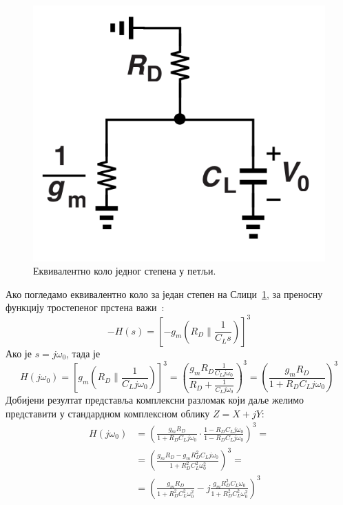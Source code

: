 \documentclass[master]{finthesis}
\begin{document}
\begin{figure}[!ht]
	 \centering
	 \includegraphics[scale=0.2]{slike/ring_osc_3.png}
	 \caption{Еквивалентно коло једног степена у петљи.}
	 \label{ring_osc_3}
\end{figure}
Ако погледамо еквивалентно коло за један степен на Слици~\ref{ring_osc_3}, за преносну функцију тростепеног прстена важи~\cite{Razavi:PLL_CMOS_2020}:
\begin{equation} 
	\label{osc_feedback_eq_9}
	-H(s) = \left[-g_{m}\left(R_{D}\|\frac{1}{C_{L}s}\right)\right]^{3}
\end{equation}
Ако је $s=j\omega_{0}$, тада је
\begin{equation} 
	\label{osc_feedback_eq_10}
	\displaystyle
	H(j\omega_{0}) = \left[g_{m}\left(R_{D}\|\frac{1}{C_{L}j\omega_{0}}\right)\right]^{3} = \left(\frac{g_{m}R_{D}\displaystyle\frac{1}{C_{L}j\omega_{0}}}{R_{D}+\displaystyle\frac{1}{C_{L}j\omega_{0}}}\right)^{3} = \left(\frac{g_{m}R_{D}}{1+R_{D}C_{L}j\omega_{0}}\right)^{3}
\end{equation}
Добијени резултат представља комплексни разломак који даље желимо представити у стандардном комплексном облику $Z = X + jY$:
\begin{equation} 
	\label{osc_feedback_eq_11}
	\displaystyle
	\begin{split}
		H(j\omega_{0}) &= \left(\frac{g_{m}R_{D}}{1+R_{D}C_{L}j\omega_{0}}\cdot\frac{1-R_{D}C_{L}j\omega_{0}}{1-R_{D}C_{L}j\omega_{0}}\right)^{3} = \\
			       &= \left(\frac{g_{m}R_{D}-g_{m}R_{D}^{2}C_{L}j\omega_{0}}{1+R_{D}^{2}C_{L}^{2}\omega_{0}^{2}}\right)^{3} = \\
			       &= \left(\frac{g_{m}R_{D}}{1+R_{D}^{2}C_{L}^{2}\omega_{0}^2}-j\frac{g_{m}R_{D}^{2}C_{L}\omega_{0}}{1+R_{D}^{2}C_{L}^{2}\omega_{0}^{2}}\right)^{3}
	\end{split}
\end{equation}
\end{document}
